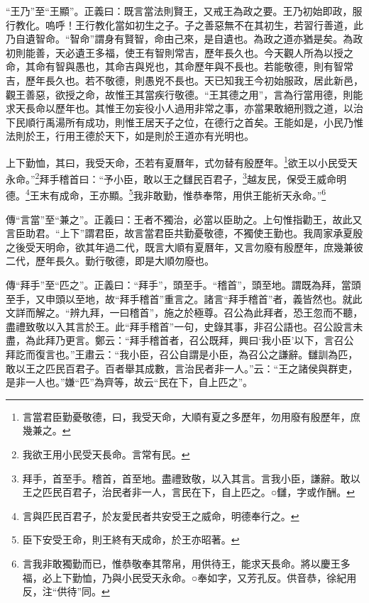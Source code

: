 {\noindent\shu{}\fzkt “王乃”至“王顯”。正義曰：既言當法則賢王，又戒王為政之要。王乃初始即政，服行教化。嗚呼！王行教化當如初生之子。子之善惡無不在其初生，若習行善道，此乃自遺智命。“智命”謂身有賢智，命由己來，是自遺也。為政之道亦猶是矣。為政初則能善，天必遺王多福，使王有智則常吉，歷年長久也。今天觀人所為以授之命，其命有智與愚也，其命吉與兇也，其命歷年與不長也。若能敬德，則有智常吉，歷年長久也。若不敬德，則愚兇不長也。天已知我王今初始服政，居此新邑，觀王善惡，欲授之命，故惟王其當疾行敬德。“王其德之用”，言為行當用德，則能求天長命以歷年也。其惟王勿妄役小人過用非常之事，亦當果敢絕刑戮之道，以治下民順行禹湯所有成功，則惟王居天子之位，在德行之首矣。王能如是，小民乃惟法則於王，行用王德於天下，如是則於王道亦有光明也。 \par}

上下勤恤，其曰，我受天命，丕若有夏曆年，式勿替有殷歷年。\footnote{言當君臣勤憂敬德，曰，我受天命，大順有夏之多歷年，勿用廢有殷歷年，庶幾兼之。}欲王以小民受天永命。”\footnote{我欲王用小民受天長命。言常有民。}拜手稽首曰：“予小臣，敢以王之讎民百君子，\footnote{拜手，首至手。稽首，首至地。盡禮致敬，以入其言。言我小臣，謙辭。敢以王之匹民百君子，治民者非一人，言民在下，自上匹之。○讎，字或作酬。}越友民，保受王威命明德。\footnote{言與匹民百君子，於友愛民者共安受王之威命，明德奉行之。}王末有成命，王亦顯。\footnote{臣下安受王命，則王終有天成命，於王亦昭著。}我非敢勤，惟恭奉幣，用供王能祈天永命。”\footnote{言我非敢獨勤而已，惟恭敬奉其幣帛，用供待王，能求天長命。將以慶王多福，必上下勤恤，乃與小民受天永命。○奉如字，又芳孔反。供音恭，徐紀用反，注“供待”同。}


{\noindent\zhuan{}\fzbyks 傳“言當”至“兼之”。正義曰：王者不獨治，必當以臣助之。上句惟指勸王，故此又言臣助君。“上下”謂君臣，故言當君臣共勤憂敬德，不獨使王勤也。我周家承夏殷之後受天明命，欲其年過二代，既言大順有夏曆年，又言勿廢有殷歷年，庶幾兼彼二代，歷年長久。勤行敬德，即是大順勿廢也。 \par}

{\noindent\zhuan{}\fzbyks 傳“拜手”至“匹之”。正義曰：“拜手”，頭至手。“稽首”，頭至地。謂既為拜，當頭至手，又申頭以至地，故“拜手稽首”重言之。諸言“拜手稽首”者，義皆然也。就此文詳而解之。“辨九拜，一曰稽首”，施之於極尊。召公為此拜者，恐王忽而不聽，盡禮致敬以入其言於王。此“拜手稽首”一句，史錄其事，非召公語也。召公設言未盡，為此拜乃更言。鄭云：“拜手稽首者，召公既拜，興曰‘我小臣’以下，言召公拜訖而復言也。”王肅云：“我小臣，召公自謂是小臣，為召公之謙辭。讎訓為匹，敢以王之匹民百君子。百者舉其成數，言治民者非一人。”云：“王之諸侯與群吏，是非一人也。”嫌“匹”為齊等，故云“民在下，自上匹之”。 \par}

